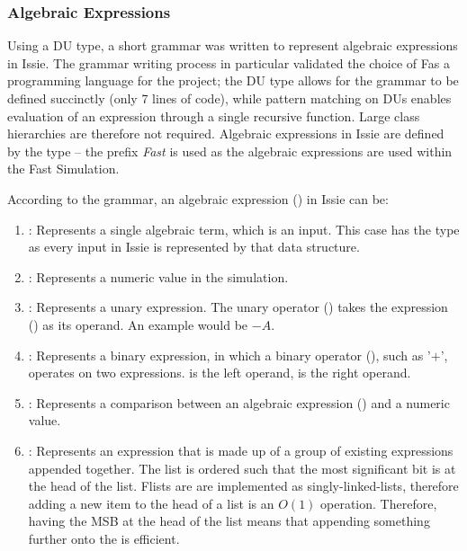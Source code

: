 \subsubsection{Algebraic Expressions} \label{subsubsec:imp_algebraexps}
Using a DU type, a short grammar was written to represent algebraic expressions in Issie. The grammar writing process in particular validated the choice of F\fsharp as a programming language for the project; the DU type allows for the grammar to be defined succinctly (only 7 lines of code), while pattern matching on DUs enables evaluation of an expression through a single recursive function. Large class hierarchies are therefore not required. Algebraic expressions in Issie are defined by the type  -- the prefix \textit{Fast} is used as the algebraic expressions are used within the Fast Simulation.

According to the grammar, an algebraic expression () in Issie can be:
\begin{enumerate}
    \item \textbf{}: Represents a single algebraic term, which is an input. This case has the type  as every input in Issie is represented by that data structure.
    \item \textbf{}: Represents a numeric value in the simulation. 
    \item \textbf{}: Represents a unary expression. The unary operator () takes the expression () as its operand. An example would be $-A$.
    \item \textbf{}: Represents a binary expression, in which a binary operator (), such as '$+$', operates on two expressions.  is the left operand,  is the right operand.
    \item \textbf{}: Represents a comparison between an algebraic expression () and a numeric value.
    \item \textbf{}: Represents an expression that is made up of a group of existing expressions appended together. The list is ordered such that the most significant bit is at the head of the list. F\fsharp lists are are implemented as singly-linked-lists, therefore adding a new item to the head of a list is an $O(1)$ operation. Therefore, having the MSB at the head of the list means that appending something further onto the  is efficient.
\end{enumerate}

